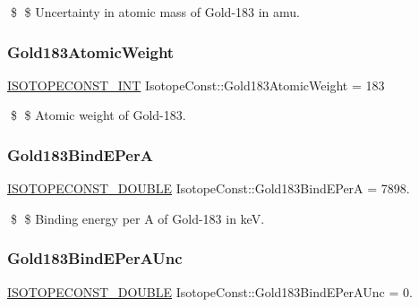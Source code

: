 \$ \$ Uncertainty in atomic mass of Gold-\/183 in amu. \mbox{\label{group___isotope_const-_gold-_au183_ga7fdf04e3310adb8005844b87ec6e594e}} 
\subsubsection{\texorpdfstring{Gold183\+Atomic\+Weight}{Gold183AtomicWeight}}
{\footnotesize\ttfamily \mbox{\hyperlink{group___isotope_const-_macros_ga5f18360b3e99483a35c32d789e62621c}{I\+S\+O\+T\+O\+P\+E\+C\+O\+N\+S\+T\+\_\+\+I\+NT}} Isotope\+Const\+::\+Gold183\+Atomic\+Weight = 183}

\$ \$ Atomic weight of Gold-\/183. \mbox{\label{group___isotope_const-_gold-_au183_ga77549f7de437ba5a245b3c1a3a5368fb}} 
\subsubsection{\texorpdfstring{Gold183\+Bind\+E\+PerA}{Gold183BindEPerA}}
{\footnotesize\ttfamily \mbox{\hyperlink{group___isotope_const-_macros_ga8f45a7272ce02c0b4c65c44636ed719a}{I\+S\+O\+T\+O\+P\+E\+C\+O\+N\+S\+T\+\_\+\+D\+O\+U\+B\+LE}} Isotope\+Const\+::\+Gold183\+Bind\+E\+PerA = 7898.}

\$ \$ Binding energy per A of Gold-\/183 in keV. \mbox{\label{group___isotope_const-_gold-_au183_ga521edf03c642939a317a57560cd93bfd}} 
\subsubsection{\texorpdfstring{Gold183\+Bind\+E\+Per\+A\+Unc}{Gold183BindEPerAUnc}}
{\footnotesize\ttfamily \mbox{\hyperlink{group___isotope_const-_macros_ga8f45a7272ce02c0b4c65c44636ed719a}{I\+S\+O\+T\+O\+P\+E\+C\+O\+N\+S\+T\+\_\+\+D\+O\+U\+B\+LE}} Isotope\+Const\+::\+Gold183\+Bind\+E\+Per\+A\+Unc = 0.}

